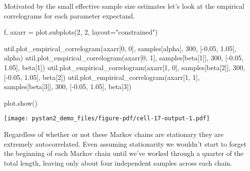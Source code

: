 \documentclass[
  letterpaper,
  DIV=11,
  numbers=noendperiod]{scrartcl}
\newenvironment{Shaded}{\begin{snugshade}}{\end{snugshade}}
\newcommand{\DecValTok}[1]{\textcolor[rgb]{0.68,0.00,0.00}{#1}}
\newcommand{\FloatTok}[1]{\textcolor[rgb]{0.68,0.00,0.00}{#1}}
\newcommand{\NormalTok}[1]{\textcolor[rgb]{0.00,0.23,0.31}{#1}}
\newcommand{\OperatorTok}[1]{\textcolor[rgb]{0.37,0.37,0.37}{#1}}
\newcommand{\StringTok}[1]{\textcolor[rgb]{0.13,0.47,0.30}{#1}}
\begin{document}
Motivated by the small effective sample size estimates let's look at the
empirical correlograms for each parameter expectand.

\begin{Shaded}
\begin{Highlighting}[]
\NormalTok{f, axarr }\OperatorTok{=}\NormalTok{ plot.subplots(}\DecValTok{2}\NormalTok{, }\DecValTok{2}\NormalTok{, layout}\OperatorTok{=}\StringTok{"constrained"}\NormalTok{)}

\NormalTok{util.plot\_empirical\_correlogram(axarr[}\DecValTok{0}\NormalTok{, }\DecValTok{0}\NormalTok{], samples[}\StringTok{\textquotesingle{}alpha\textquotesingle{}}\NormalTok{], }
                                \DecValTok{300}\NormalTok{, [}\OperatorTok{{-}}\FloatTok{0.05}\NormalTok{, }\FloatTok{1.05}\NormalTok{],  }\StringTok{\textquotesingle{}alpha\textquotesingle{}}\NormalTok{)}
\NormalTok{util.plot\_empirical\_correlogram(axarr[}\DecValTok{0}\NormalTok{, }\DecValTok{1}\NormalTok{], samples[}\StringTok{\textquotesingle{}beta[1]\textquotesingle{}}\NormalTok{], }
                                \DecValTok{300}\NormalTok{, [}\OperatorTok{{-}}\FloatTok{0.05}\NormalTok{, }\FloatTok{1.05}\NormalTok{],  }\StringTok{\textquotesingle{}beta[1]\textquotesingle{}}\NormalTok{)}
\NormalTok{util.plot\_empirical\_correlogram(axarr[}\DecValTok{1}\NormalTok{, }\DecValTok{0}\NormalTok{], samples[}\StringTok{\textquotesingle{}beta[2]\textquotesingle{}}\NormalTok{], }
                                \DecValTok{300}\NormalTok{, [}\OperatorTok{{-}}\FloatTok{0.05}\NormalTok{, }\FloatTok{1.05}\NormalTok{],  }\StringTok{\textquotesingle{}beta[2]\textquotesingle{}}\NormalTok{)}
\NormalTok{util.plot\_empirical\_correlogram(axarr[}\DecValTok{1}\NormalTok{, }\DecValTok{1}\NormalTok{], samples[}\StringTok{\textquotesingle{}beta[3]\textquotesingle{}}\NormalTok{], }
                                \DecValTok{300}\NormalTok{, [}\OperatorTok{{-}}\FloatTok{0.05}\NormalTok{, }\FloatTok{1.05}\NormalTok{],  }\StringTok{\textquotesingle{}beta[3]\textquotesingle{}}\NormalTok{)}

\NormalTok{plot.show()}
\end{Highlighting}
\end{Shaded}

\texttt{[image: pystan2\_demo\_files/figure-pdf/cell-17-output-1.pdf]}

Regardless of whether or not these Markov chains are stationary they are
extremely autocorrelated. Even assuming stationarity we wouldn't start
to forget the beginning of each Markov chain until we've worked through
a quarter of the total length, leaving only about four independent
samples across each chain.
\end{document}
